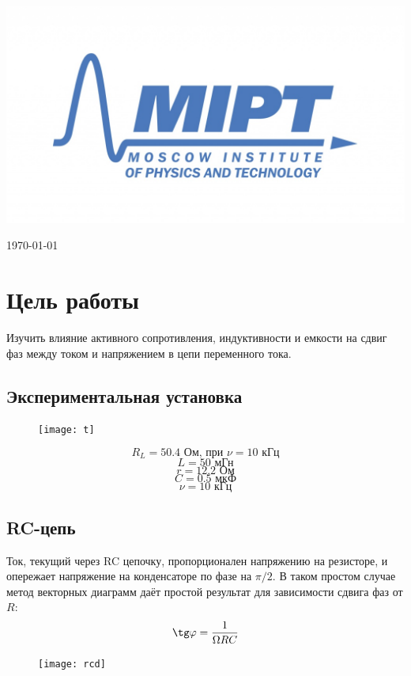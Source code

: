 \documentclass[a4paper, 12pt]{article}
\newenvironment{bottompar}{\par\vspace*{\fill}}{\clearpage}
\begin{document}
\begin{titlepage}
\begin{bottompar}
	\begin{center}
		\includegraphics[width = 80 mm]{logo.jpg}
	\end{center}
	{\large \today}

\end{bottompar}
\vfill %

\end{titlepage}

\section{Цель работы}
Изучить влияние активного сопротивления, индуктивности и емкости на сдвиг фаз между током и напряжением в цепи переменного тока.

\subsection*{Экспериментальная установка}



\begin {figure}[H]
\begin{center}
\texttt{[image: t]}
\end{center}
\end {figure}
$$R_L=50.4 \text{ Ом, при $\nu = 10 \text{ кГц}$}$$
$$L=50 \text{ мГн}$$
$$r=12.2 \text{ Ом}$$
$$C=0.5 \text{ мкФ}$$
$$\nu = 10 \text{ кГц}$$

\subsection*{RC-цепь}


Ток, текущий через RC цепочку, пропорционален напряжению на резисторе, и опережает напряжение на конденсаторе по фазе на $\pi/2$. В таком простом случае метод векторных диаграмм даёт простой результат для зависимости сдвига фаз от $R$:
$$\tg \varphi = \frac{1}{\Omega R C}$$
\begin {figure}[H]
\begin{center}
\texttt{[image: rcd]}
\end{center}
\end {figure}
\end{document}
